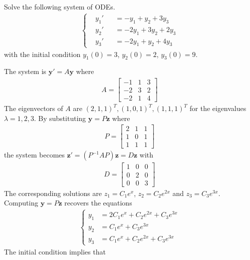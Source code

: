 \begin{Exercise}
Solve the following system of ODEs.
\begin{align*}
\left\{\begin{alignedat}{2}
&y_1'& &= -y_1 + y_2 + 3y_3\\
&y_2'& &= -2y_1 + 3y_2 + 2y_3\\
&y_3'& &= -2y_1 + y_2 + 4y_3
\end{alignedat}\right.
\end{align*}
with the initial condition $y_1(0) = 3$, $y_2(0) = 2$, $y_3(0) = 9$.
\end{Exercise}
\begin{Answer}
The system is $\textbf{y}' = A\textbf{y}$ where 
\begin{align*}
A =
\begin{bmatrix}
-1 & 1 & 3\\
-2 & 3 & 2\\
-2 & 1 & 4
\end{bmatrix}
\end{align*}
The eigenvectors of $A$ are $(2,1,1)^T, (1,0,1)^T, (1,1,1)^T$ for the eigenvalues $\lambda = 1,2,3$. By substituting $\textbf{y} = P\textbf{z}$ where 
\begin{align*}
P = 
\begin{bmatrix}
2 & 1 & 1\\
1 & 0 & 1\\
1 & 1 & 1    
\end{bmatrix}
\end{align*}
the system becomes $\textbf{z}'= (P^{-1}AP)\textbf{z} = D\textbf{z}$ with 
\begin{align*}
D = 
\begin{bmatrix}
1 & 0 & 0\\
0 & 2 & 0\\
0 & 0 & 3
\end{bmatrix}
\end{align*}
The corresponding solutions are $z_1 = C_1e^{x}$, $z_2 = C_2e^{2x}$ and $z_3 = C_3e^{3x}$. Computing $\textbf{y} = P\textbf{z}$ recovers the equations
\begin{align*}
\left\{\begin{alignedat}{1}
y_1 &= 2C_1e^{x} + C_2e^{2x} + C_3e^{3x}\\
y_2 &= C_1e^{x} + C_3e^{3x}\\
y_3 &= C_1e^{x} + C_2e^{2x} + C_3e^{3x}
\end{alignedat} \right.
\end{align*}
The initial condition implies that 
\begin{align*}

\end{align*}
\end{Answer}

